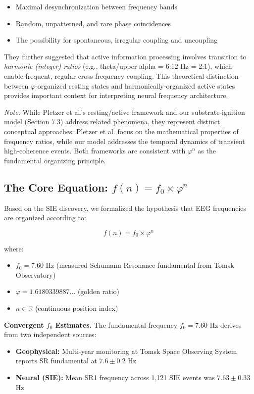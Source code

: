 \documentclass[11pt,a4paper]{article}
\newcommand{\phisym}{\varphi}
\begin{document}
\begin{itemize}
    \item Maximal desynchronization between frequency bands
    \item Random, unpatterned, and rare phase coincidences
    \item The possibility for spontaneous, irregular coupling and uncoupling
\end{itemize}

They further suggested that active information processing involves transition to \textit{harmonic (integer) ratios} (e.g., theta/upper alpha = 6:12 Hz = 2:1), which enable frequent, regular cross-frequency coupling. This theoretical distinction between $\phisym$-organized resting states and harmonically-organized active states provides important context for interpreting neural frequency architecture.

\textit{Note:} While Pletzer et al.'s resting/active framework and our substrate-ignition model (Section 7.3) address related phenomena, they represent distinct conceptual approaches. Pletzer et al. focus on the mathematical properties of frequency ratios, while our model addresses the temporal dynamics of transient high-coherence events. Both frameworks are consistent with $\phisym^n$ as the fundamental organizing principle.

\subsection{The Core Equation: $f(n) = f_0 \times \phisym^n$}

Based on the SIE discovery, we formalized the hypothesis that EEG frequencies are organized according to:

\begin{keyequation}
\begin{equation}
f(n) = f_0 \times \phisym^n
\label{eq:core}
\end{equation}

where:
\begin{itemize}
    \item $f_0 = 7.60$ Hz (measured Schumann Resonance fundamental from Tomsk Observatory)
    \item $\phisym = 1.6180339887...$ (golden ratio)
    \item $n \in \mathbb{R}$ (continuous position index)
\end{itemize}
\end{keyequation}

\textbf{Convergent $f_0$ Estimates.}
The fundamental frequency $f_0 = 7.60$ Hz derives from two independent sources:
\begin{itemize}
    \item \textbf{Geophysical:} Multi-year monitoring at Tomsk Space Observing System reports SR fundamental at $7.6 \pm 0.2$ Hz
    \item \textbf{Neural (SIE):} Mean SR1 frequency across 1,121 SIE events was $7.63 \pm 0.33$ Hz
\end{itemize}
\end{document}
